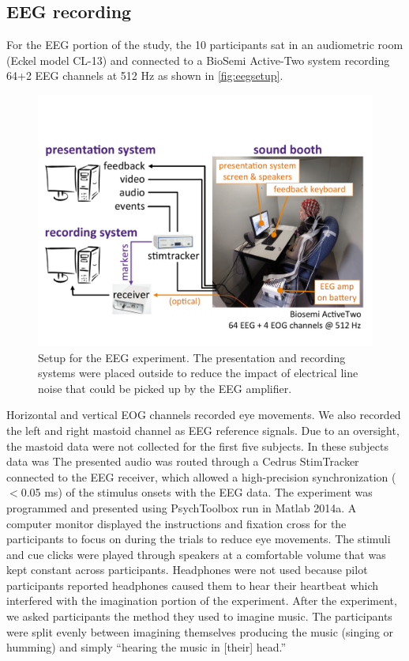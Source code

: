 \subsection{EEG recording}
For the EEG portion of the study, the 10 participants sat in an audiometric room (Eckel model CL-13) and connected to a BioSemi Active-Two system recording 64+2 EEG channels at 512 Hz as shown in \autoref{fig:eegsetup}.
\begin{figure}[htb]
  \begin{center}
    \includegraphics[scale=0.48]{Figures/EEG-setup.pdf}
    \caption{%
Setup for the EEG experiment.
The presentation and recording systems were placed outside to reduce the impact of electrical line noise that could be picked up by the EEG amplifier.
}
    \label{fig:eegsetup}
  \end{center}
\end{figure}
Horizontal and vertical EOG channels recorded eye movements. 
We also recorded the left and right mastoid channel as EEG reference signals. 
Due to an oversight, the mastoid data were not collected for the first five subjects.
In these subjects data was 
The presented audio %
was routed through a Cedrus StimTracker connected to the EEG receiver, which allowed a high-precision synchronization ($<$0.05 ms) of the stimulus onsets with the \ac{EEG} data.
The experiment was programmed and presented using PsychToolbox run in Matlab 2014a. 
A computer monitor displayed the instructions and fixation cross for the participants to focus on during the trials to reduce eye movements.
The stimuli and cue clicks were played through speakers at a comfortable volume that was kept constant across participants. Headphones were not used because pilot participants reported headphones caused them to hear their heartbeat which interfered with the imagination portion of the experiment. 
After the experiment, we asked participants the method they used to imagine music. 
The participants were split evenly between imagining themselves producing the music (singing or humming) and simply ``hearing the music in [their] head.'' 

